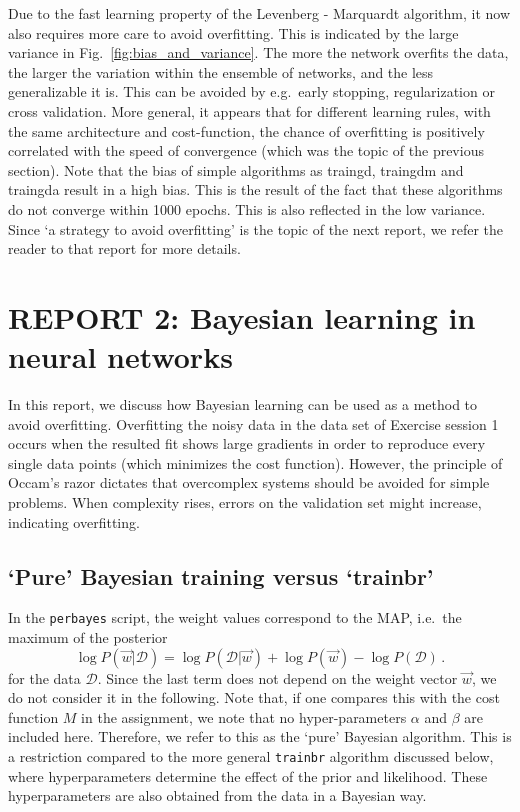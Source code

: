 \documentclass[pdftex,11pt,a4paper]{article}
\begin{document}
Due to the fast learning property of the Levenberg - Marquardt algorithm, it now also requires more care to avoid overfitting. This is indicated by the large variance in Fig.~\ref{fig:bias_and_variance}. The more the network overfits the data, the larger the variation within the ensemble of networks, and the less generalizable it is. This can be avoided by e.g.\ early stopping, regularization or cross validation. More general, it appears that for different learning rules, with the same architecture and cost-function, the chance of overfitting is positively correlated with the speed of convergence (which was the topic of the previous section). 
Note that the bias of simple algorithms as traingd, traingdm and traingda result in a high bias. This is the result of the fact that these algorithms do not converge within 1000 epochs. This is also reflected in the low variance. 
Since `a strategy to avoid overfitting' is the topic of the next report, we refer the reader to that report for more details.


\FloatBarrier
\newpage
\section{REPORT 2: Bayesian learning in neural networks}
In this report, we discuss how Bayesian learning can be used as a method to avoid overfitting. Overfitting the noisy data in the data set of Exercise session 1 occurs when the resulted fit shows large gradients in order to reproduce every single data points (which minimizes the cost function). However, the principle of Occam's razor dictates that overcomplex systems should be avoided for simple problems. When complexity rises, errors on the validation set might increase, indicating overfitting. 

\subsection{`Pure' Bayesian training versus `trainbr'}
In the \texttt{perbayes} script, the weight values correspond to the MAP, i.e.\ the maximum of the posterior
\begin{equation}
\log P(\vec{w} | \mathcal{D}) = \log P(\mathcal{D} | \vec{w}) + \log P(\vec{w}) - \log P(\mathcal{D}) \,.
\end{equation}
for the data $\mathcal{D}$. Since the last term does not depend on the weight vector $\vec{w}$, we do not consider it in the following. Note that, if one compares this with the cost function $M$ in the assignment, we note that no hyper-parameters $\alpha$ and $\beta$ are included here. Therefore, we refer to this as the `pure' Bayesian algorithm. This is a restriction compared to the more general \texttt{trainbr} algorithm discussed below, where hyperparameters determine the effect of the prior and likelihood. These hyperparameters are also obtained from the data in a Bayesian way.
\end{document}
